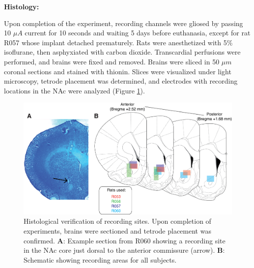 \documentclass[11pt]{article}
\newcommand{\bsf}[1]{\textbf{#1}}
\providecommand{\DIFaddbeginFL}{} %
\providecommand{\DIFaddendFL}{} %
\providecommand{\DIFdelbeginFL}{} %
\providecommand{\DIFdelendFL}{} %
\newcommand{\DIFscaledelfig}{0.5}
\newlength{\DIFdelgraphicswidth} %
\newlength{\DIFdelgraphicsheight} %
\newcommand{\DIFaddincludegraphics}[2][]{{\color{blue}\fbox{\DIFOincludegraphics[#1]{#2}}}} %
\newcommand{\DIFdelincludegraphics}[2][]{%
\sbox{\DIFdelgraphicsbox}{\DIFOincludegraphics[#1]{#2}}%
\settoboxwidth{\DIFdelgraphicswidth}{\DIFdelgraphicsbox} %
\settoboxtotalheight{\DIFdelgraphicsheight}{\DIFdelgraphicsbox} %
\scalebox{\DIFscaledelfig}{%
\parbox[b]{\DIFdelgraphicswidth}{\usebox{\DIFdelgraphicsbox}\\[-\baselineskip] \rule{\DIFdelgraphicswidth}{0em}}\llap{\resizebox{\DIFdelgraphicswidth}{\DIFdelgraphicsheight}{%
\setlength{\unitlength}{\DIFdelgraphicswidth}%
\begin{picture}(1,1)%
\thicklines\linethickness{2pt} %
{\color[rgb]{1,0,0}\put(0,0){\framebox(1,1){}}}%
{\color[rgb]{1,0,0}\put(0,0){\line( 1,1){1}}}%
{\color[rgb]{1,0,0}\put(0,1){\line(1,-1){1}}}%
\end{picture}%
}\hspace*{3pt}}} %
} %
\DeclareRobustCommand{\DIFaddbeginFL}{\DIFOaddbeginFL \let\includegraphics\DIFaddincludegraphics} %
\DeclareRobustCommand{\DIFaddendFL}{\DIFOaddendFL \let\includegraphics\DIFOincludegraphics} %
\DeclareRobustCommand{\DIFdelbeginFL}{\DIFOdelbeginFL \let\includegraphics\DIFdelincludegraphics} %
\DeclareRobustCommand{\DIFdelendFL}{\DIFOaddendFL \let\includegraphics\DIFOincludegraphics} %
\begin{document}
{\bf Histology:}

Upon completion of the experiment, recording channels were gliosed by passing 10 $\mu A$ current for 10 seconds and waiting 5 days before euthanasia, except for rat R057 whose implant detached prematurely. Rats were anesthetized with 5\%
isoflurane, then asphyxiated with carbon dioxide. Transcardial
perfusions were performed, and brains were fixed and removed. Brains
were sliced in 50 $\mu m$ coronal sections and stained with
thionin. Slices were visualized under light microscopy, tetrode
placement was determined, and electrodes with recording locations in
the NAc were analyzed (Figure \ref{fig:histo}).

 \begin{figure}[ht!]
\centering
\DIFdelbeginFL %
\DIFdelendFL \DIFaddbeginFL \includegraphics[width=\textwidth]{Fig 10 - Histology.png}
\DIFaddendFL \caption{Histological verification of recording sites. Upon completion of
  experiments, brains were sectioned and tetrode placement was
  confirmed. \bsf{A}: Example section from R060 showing a recording site in the
  NAc core just dorsal to the anterior commissure (arrow). \bsf{B}:
  Schematic showing recording areas for all subjects.}
\label{fig:histo}
\end{figure} \clearpage
\end{document}
